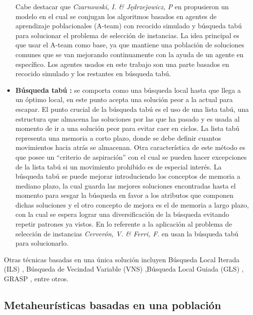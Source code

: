 \begin{itemize}
Cabe destacar que \emph{Czarnowski, I. \& J{\k{e}}drzejowicz, P} en \cite{czarnowski2011application} propusieron un modelo en el cual se conjugan los algoritmos basados en agentes de aprendizaje poblacionales (A-team) \cite{talukdar1998asynchronous} con recocido simulado y búsqueda tabú para solucionar el problema de selección de instancias. La idea principal es que usar el A-team como base, ya que mantiene una población de soluciones comunes que se van mejorando continuamente con la ayuda de un agente en específico. Los agentes usados en este trabajo son una parte basados en recocido simulado y los restantes en búsqueda tabú.

\item \textbf{Búsqueda tabú \cite{talbi2009metaheuristics,glover1989tabu}:}
se comporta como una búsqueda local hasta que llega a un óptimo local, en este punto acepta una solución peor a la actual para escapar. El punto crucial de la búsqueda tabú es el uso de una lista tabú, una estructura que almacena las soluciones por las que ha pasado y es usada al momento de ir a una solución peor para evitar caer en ciclos. La lista tabú representa una memoria a corto plazo, donde se debe definir cuantos movimientos hacia atrás se almacenan. Otra característica de este método es que posee un ``criterio de aspiración'' con el cual se pueden hacer excepciones de la lista tabú si un movimiento prohibido es de especial interés. La búsqueda tabú se puede mejorar introduciendo los conceptos de memoria a mediano plazo, la cual guarda las mejores soluciones encontradas hasta el momento para sesgar la búsqueda en favor a los atributos que componen dichas soluciones y el otro concepto de mejora es el de memoria a largo plazo, con la cual se espera lograr una diversificación de la búsqueda evitando repetir patrones ya vistos. En lo referente a la aplicación al problema de selección de instancias \emph{Cerverón, V. \& Ferri, F.} en \cite{cerveron2001another} usan la búsqueda tabú para solucionarlo.
\end{itemize}

Otras técnicas basadas en una única solución incluyen Búsqueda Local Iterada (ILS) \cite{lourencco2003iterated}, Búsqueda de Vecindad Variable (VNS) \cite{mladenovic1997variable},Búsqueda Local Guiada (GLS) \cite{voudouris1998guided}, GRASP \cite{feo1995greedy}, entre otros.

\subsection{Metaheurísticas basadas en una población}

